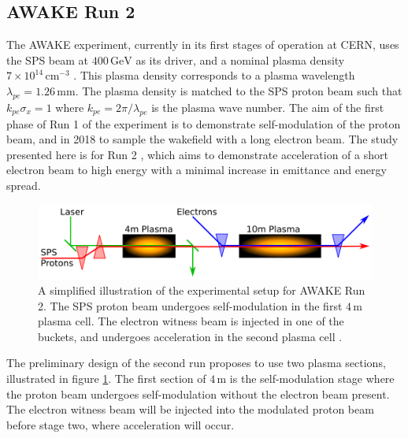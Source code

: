 \documentclass[aps,prstab,reprint,amsmath,amssymb,groupedaddress]{revtex4-1}
\newcommand{\unit}[1]{\,\mathrm{#1}}
\newcommand{\nexp}[1]{\times 10^{#1}}
\begin{document}
\subsection[\label{S:I:AWAKE}]{AWAKE Run 2}

The AWAKE experiment, currently in its first stages of operation at CERN, uses the SPS beam at $400\unit{GeV}$ as its
driver, and a nominal plasma density $7\nexp{14}\unit{cm}^{-3}$ \cite{gschwendtner:2016}. This plasma density
corresponds to a plasma wavelength $\lambda_{pe} = 1.26\unit{mm}$. The plasma density is matched to the SPS proton beam
such that $k_{pe}\sigma_{x} = 1$ where $k_{pe} = 2\pi/\lambda_{pe}$ is the plasma wave number. The aim of the first
phase of Run 1 of the experiment is to demonstrate self-modulation of the proton beam, and in 2018 to sample the
wakefield with a long electron beam. The study presented here is for Run 2 \cite{adli:2016}, which aims to demonstrate
acceleration of a short electron beam to high energy with a minimal increase in emittance and energy spread.

\begin{figure}[hbt]
    \includegraphics[width=0.99\linewidth,trim={1mm 2mm 1mm 2mm},clip]{figures/figAWAKE}
    \caption{\label{Fig:AWAKER2} A simplified illustration of the experimental setup for AWAKE Run 2. The SPS proton
        beam undergoes self-modulation in the first $4\unit{m}$ plasma cell. The electron witness beam is injected in
        one of the buckets, and undergoes acceleration in the second plasma cell \cite{berglyd_olsen:2015, adli:2016}.}
\end{figure}

The preliminary design of the second run proposes to use two plasma sections, illustrated in figure \ref{Fig:AWAKER2}.
The first section of $4\unit{m}$ is the self-modulation stage where the proton beam undergoes self-modulation without
the electron beam present. The electron witness beam will be injected into the modulated proton beam before stage two,
where acceleration will occur.
\end{document}
